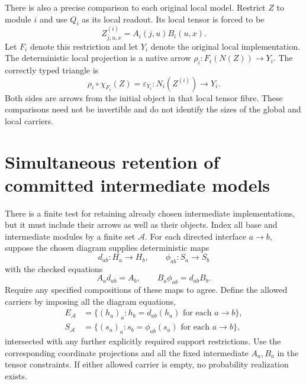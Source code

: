 \documentclass[11pt]{article}
\theoremstyle{remark}
\begin{document}
There is also a precise comparison to each original local model. Restrict $Z$ to module $i$ and use $Q_i$ as its local readout. Its local tensor is forced to be
\[
 Z^{(i)}_{j,u,x}=A_i(j,u)B_i(u,x).
\]
Let $F_i$ denote this restriction and let $Y_i$ denote the original local implementation. The deterministic local projection is a native arrow $\rho_i:F_i(N(Z))\to Y_i$. The correctly typed triangle is
\begin{equation}\label{eq:local-triangle}
 \rho_i\circ\chi_{F_i}(Z)=\varepsilon_{Y_i}:
 N_i(Z^{(i)})\longrightarrow Y_i.
\end{equation}
Both sides are arrows from the initial object in that local tensor fibre. These comparisons need not be invertible and do not identify the sizes of the global and local carriers.

\section{Simultaneous retention of committed intermediate models}\label{sec:intermediates}

There is a finite test for retaining already chosen intermediate implementations, but it must include their arrows as well as their objects. Index all base and intermediate modules by a finite set $\mathcal A$. For each directed interface $a\to b$, suppose the chosen diagram supplies deterministic maps
\[
 d_{ab}:H_a\to H_b,\qquad \phi_{ab}:S_a\to S_b
\]
with the checked equations
\begin{equation}\label{eq:intermediate-squares}
 A_ad_{ab}=A_b,\qquad B_a\phi_{ab}=d_{ab}B_b.
\end{equation}
Require any specified compositions of these maps to agree. Define the allowed carriers by imposing all the diagram equations,
\begin{equation}\label{eq:diagram-carriers}
 \begin{split}
 E_{\mathcal A}&=\{(h_a)_a:h_b=d_{ab}(h_a)\text{ for each }a\to b\},\\
 S_{\mathcal A}&=\{(s_a)_a:s_b=\phi_{ab}(s_a)\text{ for each }a\to b\},
 \end{split}
\end{equation}
intersected with any further explicitly required support restrictions. Use the corresponding coordinate projections and all the fixed intermediate $A_a,B_a$ in the tensor constraints. If either allowed carrier is empty, no probability realization exists.
\end{document}
